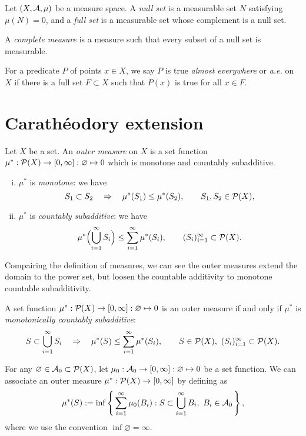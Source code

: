 \documentclass{../../large}
\begin{document}
\begin{prb}
Let $(X,\mathcal{A},\mu)$ be a measure space.
A \emph{null set} is a measurable set $N$ satisfying $\mu(N)=0$, and a \emph{full set} is a measurable set whose complement is a null set.

A \emph{complete measure} is a measure such that every subset of a null set is measurable.

For a predicate $P$ of points $x\in X$, we say $P$ is true \emph{almost everywhere} or \emph{a.e.} on $X$ if there is a full set $F\subset X$ such that $P(x)$ is true for all $x\in F$.
\end{prb}



\section{Carath\'eodory extension}

\begin{prb}
Let $X$ be a set.
An \emph{outer measure} on $X$ is a set function $\mu^*:\mathcal{P}(X)\to[0,\infty]:\varnothing\mapsto0$ which is monotone and countably subadditive.
\begin{enumerate}[(i)]
\item $\mu^*$ is \emph{monotone}: we have
\[S_1\subset S_2\quad\Rightarrow\quad\mu^*(S_1)\le\mu^*(S_2),\qquad S_1,S_2\in\mathcal{P}(X),\]
\item $\mu^*$ is \emph{countably subadditive}: we have
\[\mu^*\Bigl(\bigcup_{i=1}^\infty S_i\Bigr)\le\sum_{i=1}^\infty\mu^*(S_i),\qquad (S_i)_{i=1}^\infty\subset\mathcal{P}(X).\]
\end{enumerate}
Compairing the definition of measures, we can see the outer measures extend the domain to the power set, but loosen the countable additivity to monotone countable subadditivity.
\begin{parts}
\item A set function $\mu^*:\mathcal{P}(X)\to[0,\infty]:\varnothing\mapsto0$ is an outer measure if and only if $\mu^*$ is \emph{monotonically countably subadditive}:
\[S\subset\bigcup_{i=1}^\infty S_i\quad\Rightarrow\quad\mu^*(S)\le\sum_{i=1}^\infty\mu^*(S_i),\qquad S\in\mathcal{P}(X),\ (S_i)_{i=1}^\infty\subset\mathcal{P}(X).\]
\item
For any $\varnothing\in\mathcal{A}_0\subset\mathcal{P}(X)$, let $\mu_0:\mathcal{A}_0\to[0,\infty]:\varnothing\mapsto0$ be a set function.
We can associate an outer measure $\mu^*:\mathcal{P}(X)\to[0,\infty]$ by defining as
\[\mu^*(S):=\inf\left\{\,\sum_{i=1}^\infty\mu_0(B_i):S\subset\bigcup_{i=1}^\infty B_i,\ B_i\in\mathcal{A}_0\,\right\},\]
where we use the convention $\inf\varnothing=\infty$.
\end{parts}
\end{prb}
\begin{pf}
\end{pf}
\end{document}
